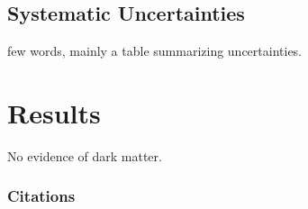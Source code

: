 \documentclass[%
 reprint,
 amsmath,amssymb,
 aps,
]{revtex4-1}
\begin{document}
\subsection{Systematic Uncertainties}

few words, mainly a table summarizing uncertainties.

\section{Results}
No evidence of dark matter.

\subsubsection{Citations}
\end{document}
